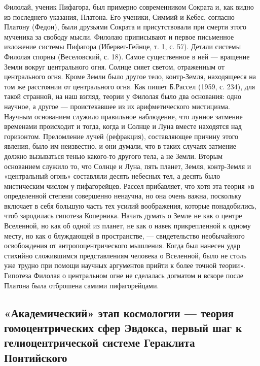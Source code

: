 Филолай, ученик  Пифагора, был  примерно современником Сократа  и, как
видно из  последнего указания, Платона.  Его ученики, Симмий  и Кебес,
согласно Платону  (Федон), были друзьями Сократа  и присутствовали при
смерти этого мученика  за свободу мысли. Филолаю  приписывают и первое
письменное  изложение  системы  Пифагора  (Ибервег-Гейнце,  т.  1,  с.
57).  Детали  системы  Филолая  спорны  (Веселовский,  с.  18).  Самое
существенное  в  ней  ---  вращение Земли  вокруг  центрального  огня.
Солнце  сияет светом,  отраженным  от центрального  огня. Кроме  Земли
было другое  тело, контр-Земля,  находящееся на  том же  расстоянии от
центрального  огня.  Как пишет  Б.Рассел  (1959,  с. 234),  для  такой
странной, на  наш взгляд,  теории у Филолая  было два  основания: одно
научное, а другое ---  проистекавшее из их арифметического мистицизма.
Научным основанием служило правильное  наблюдение, что лунное затмение
временами происходит и  тогда, когда и Солнце и  Луна вместе находятся
над  горизонтом. Преломление  лучей (рефракция),  составляющее причину
этого явления, было  им неизвестно, и они думали, что  в таких случаях
затмение должно вызываться  тенью какого-то другого тела,  а не Земли.
Вторым основанием служило  то, что Солнце и Луна,  пять планет, Земля,
контр-Земля и  «центральный огонь»  составляли десять небесных  тел, а
десять было мистическим числом  у пифагорейцев. Рассел прибавляет, что
хотя эта  теория «в определенной  степени совершенно ненаучна,  но она
очень  важна,  поскольку включает  в  себя  большую часть  тех  усилий
воображения, которые понадобились, чтоб зародилась гипотеза Коперника.
Начать думать о  Земле не как о  центре Вселенной, но как  об одной из
планет,  не  как о  навек  прикрепленной  к  одному  месту, но  как  о
блуждающей в пространстве, --- свидетельство необычайного освобождения
от  антропоцентрического мышления.  Когда  был  нанесен удар  стихийно
сложившимся  представлениям человека  о Вселенной,  было не  столь уже
трудно при  помощи научных аргументов  прийти к более  точной теории».
Гипотеза Филолая  о центральном  огне не  сделалась догматом  и вскоре
после Платона была отброшена самими пифагорейцами.

\subsection{«Академический»     этап     космологии     ---     теория
гомоцентрических сфер Эвдокса, первый  шаг к гелиоцентрической системе
Гераклита Понтийского}

